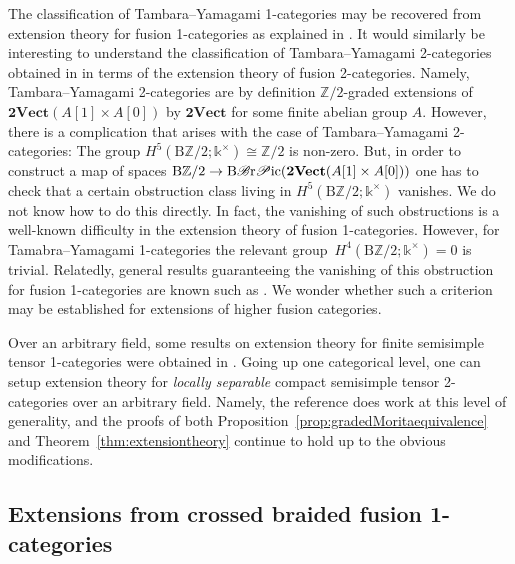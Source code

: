 \documentclass[10pt,a4paper]{amsart}
\numberwithin{equation}{section}
\begin{document}
\begin{Remark}
The classification of Tambara--Yamagami 1-categories may be recovered from extension theory for fusion 1-categories as explained in \cite[Section~9.2]{ENO2}. It would similarly be interesting to understand the classification of Tambara--Yamagami 2-categories obtained in \cite[Proposition~5.2.3]{DY23} in terms of the extension theory of fusion 2-categories. Namely, Tambara--Yamagami 2-categories are by definition $\mathbb{Z}/2$-graded extensions of $\mathbf{2Vect}(A[1]\times A[0])$ by $\mathbf{2Vect}$ for some finite abelian group $A$. However, there is a complication that arises with the case of Tambara--Yamagami 2-categories: The group $H^5(\mathrm{B}\mathbb{Z}/2;\mathds{k}^{\times})\cong\mathbb{Z}/2$ is non-zero. But, in order to construct a map of spaces $\mathrm{B}\mathbb{Z}/2\rightarrow \mathrm{B}\mathscr{B}{\rm r}\mathscr{P}{\rm ic}(\mathbf{2Vect}(A[1]\times A[0]))$ one has to check that a certain obstruction class living in $H^5(\mathrm{B}\mathbb{Z}/2;\mathds{k}^{\times})$ vanishes. We do not know how to do this directly. In fact, the vanishing of such obstructions is a well-known difficulty in the extension theory of fusion 1-categories. However, for Tamabra--Yamagami 1-categories the relevant group~${H^4(\mathrm{B}\mathbb{Z}/2;\mathds{k}^{\times})=0}$ is trivial. Relatedly, general results guaranteeing the vanishing of this obstruction for fusion 1-categories are known such as \cite[Theorem~8.16]{ENO2}. We wonder whether such a criterion may be established for extensions of higher fusion categories.
\end{Remark}

\begin{Remark}
Over an arbitrary field, some results on extension theory for finite semisimple tensor 1-categories were obtained in \cite{San}. Going up one categorical level, one can setup extension theory for \textit{locally separable} compact semisimple tensor 2-categories over an arbitrary field. Namely, the reference \cite{D10} does work at this level of generality, and the proofs of both Proposition~\ref{prop:gradedMoritaequivalence} and Theorem~\ref{thm:extensiontheory} continue to hold up to the obvious modifications.
\end{Remark}

\subsection{Extensions from crossed braided fusion 1-categories}
\end{document}

